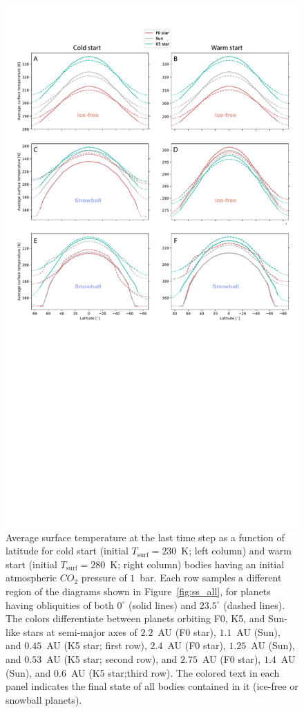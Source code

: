 \documentclass[fleqn,usenatbib]{mnras}
\begin{document}
\begin{figure}
	\includegraphics[width=\textwidth]{Figures/Comparison_a0.pdf}
    \caption{Average surface temperature at the last time step as a function of latitude for cold start (initial  $T_{\mathrm{surf}}=230$~K; left column) and warm start (initial $T_{\mathrm{surf}}=280$~K; right column) bodies having an initial atmospheric $CO_{\mathrm{2}}$ pressure of $1$~bar. Each row samples a different region of the diagrams shown in Figure~\ref{fig:ss_all}, for planets having obliquities of both $0^{\circ}$ (solid lines) and $23.5^{\circ}$ (dashed lines). The colors differentiate between planets orbiting F0, K5, and Sun-like stars at semi-major axes of $2.2$~AU (F0 star), $1.1$~AU (Sun), and $0.45$~AU (K5 star; first row), $2.4$~AU (F0 star), $1.25$~AU (Sun), and $0.53$~AU (K5 star; second row), and $2.75$~AU (F0 star), $1.4$~AU (Sun), and $0.6$~AU (K5 star;third row). The colored text in each panel indicates the final state of all bodies contained in it (ice-free or snowball planets).
    }
    \label{fig:comp_a0}
\end{figure}
\end{document}
